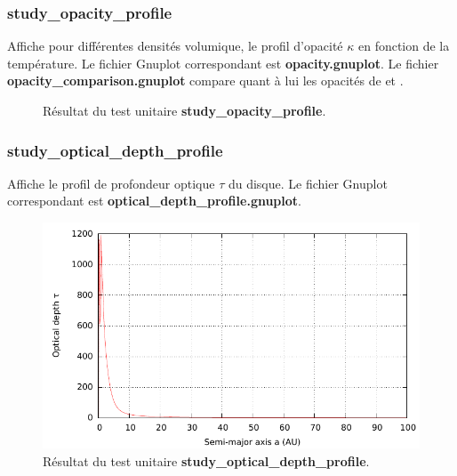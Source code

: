 \subsubsection{study\_opacity\_profile}
Affiche pour différentes densités volumique, le profil d'opacité $\kappa$ en fonction de la température.  Le fichier Gnuplot correspondant est \textbf{opacity.gnuplot}. Le fichier \textbf{opacity\_comparison.gnuplot} compare quant à lui les opacités de \cite{bell1994FU} et \cite{zhu2009nonsteady}. 

\begin{figure}[htbp]
\centering
{}\hfill
{}

\caption{Résultat du test unitaire \textbf{study\_opacity\_profile}.}
\end{figure}

\subsubsection{study\_optical\_depth\_profile}
Affiche le profil de profondeur optique $\tau$ du disque. Le fichier Gnuplot correspondant est \textbf{optical\_depth\_profile.gnuplot}. 

\begin{figure}[htbp]
\centering
\includegraphics[width=0.65\linewidth]{figure/unitary_tests/optical_depth_profile.pdf}
\caption{Résultat du test unitaire \textbf{study\_optical\_depth\_profile}.}
\end{figure}

